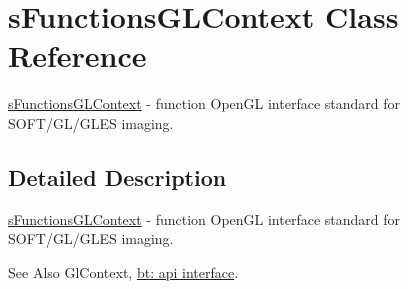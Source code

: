 \hypertarget{structs_functions_g_l_context}{\section{s\-Functions\-G\-L\-Context Class Reference}
\label{structs_functions_g_l_context}
}


\hyperlink{structs_functions_g_l_context}{s\-Functions\-G\-L\-Context} -\/ function Open\-G\-L interface standard for S\-O\-F\-T/\-G\-L/\-G\-L\-E\-S imaging.  




\subsection{Detailed Description}
\hyperlink{structs_functions_g_l_context}{s\-Functions\-G\-L\-Context} -\/ function Open\-G\-L interface standard for S\-O\-F\-T/\-G\-L/\-G\-L\-E\-S imaging. 

\begin{DoxySeeAlso}{See Also}
Gl\-Context, \hyperlink{group__apiinterface}{bt\-: api interface}. 
\end{DoxySeeAlso}
